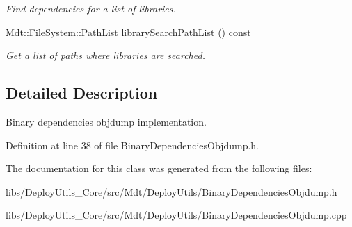 \begin{DoxyCompactItemize}
\begin{DoxyCompactList}\small\item\em Find dependencies for a list of libraries. \end{DoxyCompactList}\item 
\hyperlink{class_mdt_1_1_file_system_1_1_path_list}{Mdt\+::\+File\+System\+::\+Path\+List} \hyperlink{class_mdt_1_1_deploy_utils_1_1_binary_dependencies_objdump_a6e7bd00a4aa2ef965eb263d81981faf2}{library\+Search\+Path\+List} () const \hypertarget{class_mdt_1_1_deploy_utils_1_1_binary_dependencies_objdump_a6e7bd00a4aa2ef965eb263d81981faf2}{}\label{class_mdt_1_1_deploy_utils_1_1_binary_dependencies_objdump_a6e7bd00a4aa2ef965eb263d81981faf2}

\begin{DoxyCompactList}\small\item\em Get a list of paths where libraries are searched. \end{DoxyCompactList}\end{DoxyCompactItemize}


\subsection{Detailed Description}
Binary dependencies objdump implementation. 

Definition at line 38 of file Binary\+Dependencies\+Objdump.\+h.



The documentation for this class was generated from the following files\+:\begin{DoxyCompactItemize}
\item 
libs/\+Deploy\+Utils\+\_\+\+Core/src/\+Mdt/\+Deploy\+Utils/Binary\+Dependencies\+Objdump.\+h\item 
libs/\+Deploy\+Utils\+\_\+\+Core/src/\+Mdt/\+Deploy\+Utils/Binary\+Dependencies\+Objdump.\+cpp\end{DoxyCompactItemize}
